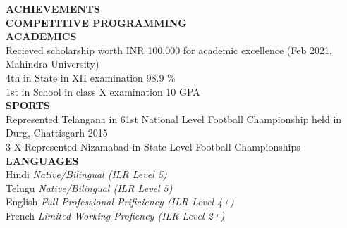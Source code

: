 \documentclass[a4paper, oneside, 11pt]{article}
\begin{document}
\begin{Parallel}{0.39\textwidth}{0.58\textwidth}
{	\noindent
    {\large \textbf{ACHIEVEMENTS}} \\
    \textbf {COMPETITIVE PROGRAMMING} \\
    \textbf{ACADEMICS} \\
	Recieved scholarship worth INR 100,000 for academic excellence (Feb 2021, Mahindra University) \\
    4th in State in XII examination 98.9 \% \\
    1st in School in class  X examination 10 GPA \\
    \noindent
    \textbf{SPORTS} \\
    Represented Telangana in 61st National Level Football Championship held in Durg, Chattisgarh 2015 \\
    3 X Represented Nizamabad in State Level Football Championships \\
	\noindent
    {\large \textbf{LANGUAGES}} \\
    \textbullet Hindi \textit{Native/Bilingual (ILR Level 5)} \\
    \textbullet Telugu \textit{Native/Bilingual (ILR Level 5)} \\
    \textbullet English \textit{Full Professional Prificiency (ILR Level 4+)} \\
    \textbullet French \textit{Limited Working Profiency (ILR Level 2+)} \\
    }
\end{Parallel}
\end{document}
